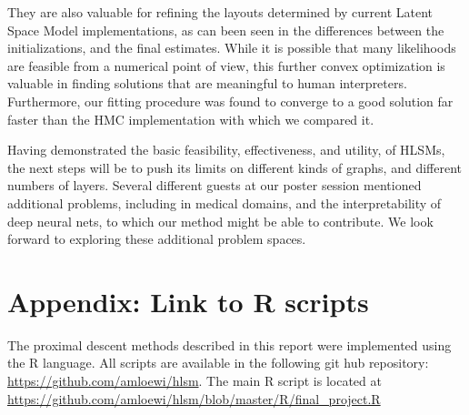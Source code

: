 \documentclass{article}
\begin{document}
They are also valuable for refining the layouts determined by current Latent Space Model implementations, as can been seen in the differences between the initializations, and the final estimates. While it is possible that many likelihoods are feasible from a numerical point of view, this further convex optimization is valuable in finding solutions that are meaningful to human interpreters. Furthermore, our fitting procedure was found to converge to a good solution far faster than the HMC implementation with which we compared it.

Having demonstrated the basic feasibility, effectiveness, and utility, of HLSMs, the next steps will be to push its limits on different kinds of graphs, and different numbers of layers. Several different guests at our poster session mentioned additional problems, including in medical domains, and the interpretability of deep neural nets, to which our method might be able to contribute. We look forward to exploring these additional problem spaces.



\section*{Appendix: Link to R scripts}

The proximal descent methods described in this report were implemented using the R language. All scripts are available in the following git hub repository: \url{https://github.com/amloewi/hlsm}. The main R script is located at \url{https://github.com/amloewi/hlsm/blob/master/R/final_project.R}
\end{document}
